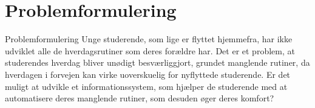 \section{Problemformulering}
\begin{frame}{Problemformulering}{}
Unge studerende, som lige er flyttet hjemmefra, har ikke udviklet alle de hverdagsrutiner som deres forældre har. Det er et problem, at studerendes hverdag bliver unødigt besværliggjort, grundet manglende rutiner, da hverdagen i forvejen kan virke uoverskuelig for nyflyttede studerende. Er det muligt at udvikle et informationssystem, som hjælper de studerende med at automatisere deres manglende rutiner, som desuden øger deres komfort?
\end{frame}